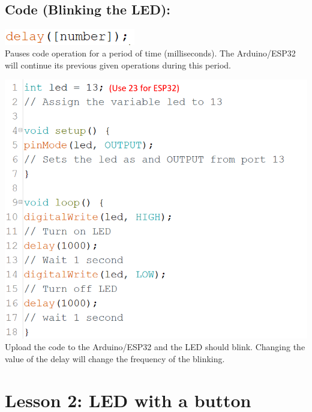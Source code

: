 \documentclass[a4paper,12pt]{report}
\newcommand{\diagramWidth}{150mm}
\newcommand{\codeHeight}{7mm}
\begin{document}
\newpage
\subsection*{Code (Blinking the LED):}
    \begin{mdframed}[linewidth = 3, linecolor = turbo_purple]
        \includegraphics[height = \codeHeight]{Assets/delay.png} \\
        Pauses code operation for a period of time (milliseconds). The Arduino/ESP32 will continue its previous given operations during this period.
    \end{mdframed}
    \vspace{10mm}
    \includegraphics[width = \diagramWidth]{Assets/blink_led.png} \\
    Upload the code to the Arduino/ESP32 and the LED should blink. Changing the value of the delay will change the frequency of the blinking.

\newpage

\section*{Lesson 2: LED with a button}
\end{document}
